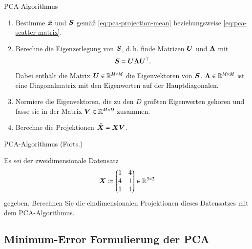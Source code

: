 \begin{frame}{PCA-Algorithmus}{}
	\begin{myalg}
		\begin{enumerate}
			\item Bestimme $\bm{\bar{x}}$ und $\bm{S}$ gemäß \eqref{eq:pca-projection-mean} beziehungsweise
				\eqref{eq:pca-scatter-matrix}.
			\item Berechne die Eigenzerlegung von $\bm{S}$, d.\,h. finde Matrizen $\bm{U}$ und $\bm{\Lambda}$ mit
				$$\bm{S} = \bm{U} \bm{\Lambda} \bm{U}^\top.$$ Dabei enthält die Matrix $\bm{U} \in \mathbb{R}^{M \times M}$ die
				Eigenvektoren von $\bm{S}$. $\bm{\Lambda} \in \mathbb{R}^{M \times M}$ ist eine Diagonalmatrix
				mit den Eigenwerten auf der Hauptdiagonalen.
			\item Normiere die Eigenvektoren, die zu den $D$ größten Eigenwerten gehören und fasse sie in der Matrix
				$\bm{V} \in \mathbb{R}^{M \times D}$ zusammen.
			\item Berechne die Projektionen $\bm{\tilde{X}} = \bm{X} \bm{V}$.
		\end{enumerate}
	\end{myalg}
\end{frame}


\begin{frame}{PCA-Algorithmus (Forts.)}{}
	\begin{mytask}
		Es sei der zweidimensionale Datensatz
		\begin{equation*}
			\bm{X} \coloneqq \begin{pmatrix} 1 & 4 \\ 4 & 1 \\ 1 & 1 \end{pmatrix} \in \mathbb{R}^{3 \times 2}
		\end{equation*} gegeben. Berechnen Sie die eindimensionalen Projektionen dieses Datensatzes
		mit dem PCA-Algorithmus.
	\end{mytask}
\end{frame}


\subsection{Minimum-Error Formulierung der PCA}

